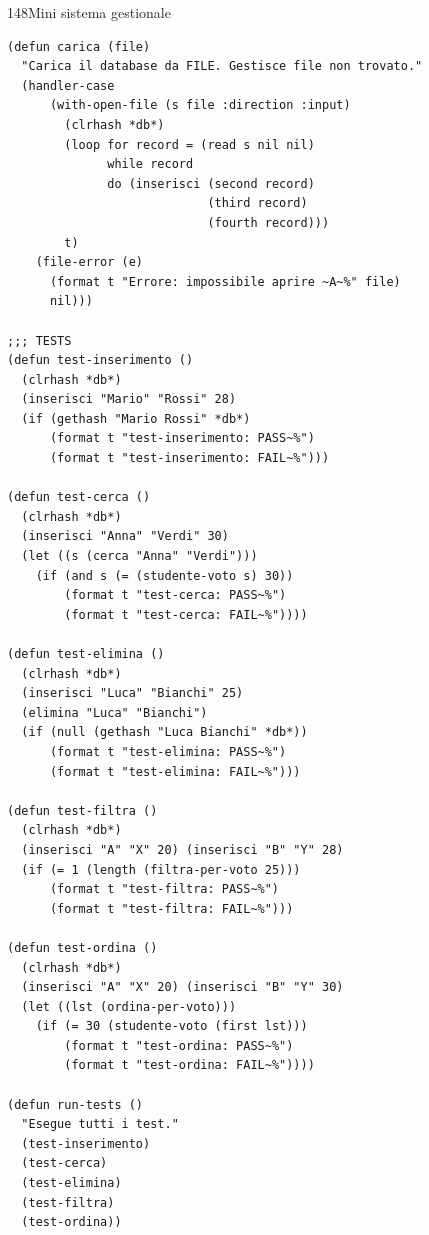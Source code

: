 \begin{solbox}{148}{Mini sistema gestionale}
\begin{lstlisting}
(defun carica (file)
  "Carica il database da FILE. Gestisce file non trovato."
  (handler-case
      (with-open-file (s file :direction :input)
        (clrhash *db*)
        (loop for record = (read s nil nil)
              while record
              do (inserisci (second record)
                            (third record)
                            (fourth record)))
        t)
    (file-error (e)
      (format t "Errore: impossibile aprire ~A~%" file)
      nil)))

;;; TESTS
(defun test-inserimento ()
  (clrhash *db*)
  (inserisci "Mario" "Rossi" 28)
  (if (gethash "Mario Rossi" *db*)
      (format t "test-inserimento: PASS~%")
      (format t "test-inserimento: FAIL~%")))

(defun test-cerca ()
  (clrhash *db*)
  (inserisci "Anna" "Verdi" 30)
  (let ((s (cerca "Anna" "Verdi")))
    (if (and s (= (studente-voto s) 30))
        (format t "test-cerca: PASS~%")
        (format t "test-cerca: FAIL~%"))))

(defun test-elimina ()
  (clrhash *db*)
  (inserisci "Luca" "Bianchi" 25)
  (elimina "Luca" "Bianchi")
  (if (null (gethash "Luca Bianchi" *db*))
      (format t "test-elimina: PASS~%")
      (format t "test-elimina: FAIL~%")))

(defun test-filtra ()
  (clrhash *db*)
  (inserisci "A" "X" 20) (inserisci "B" "Y" 28)
  (if (= 1 (length (filtra-per-voto 25)))
      (format t "test-filtra: PASS~%")
      (format t "test-filtra: FAIL~%")))

(defun test-ordina ()
  (clrhash *db*)
  (inserisci "A" "X" 20) (inserisci "B" "Y" 30)
  (let ((lst (ordina-per-voto)))
    (if (= 30 (studente-voto (first lst)))
        (format t "test-ordina: PASS~%")
        (format t "test-ordina: FAIL~%"))))

(defun run-tests ()
  "Esegue tutti i test."
  (test-inserimento)
  (test-cerca)
  (test-elimina)
  (test-filtra)
  (test-ordina))
\end{lstlisting}
\end{solbox}


